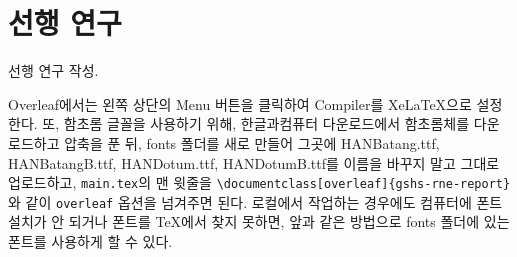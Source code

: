 \section{선행 연구}
선행 연구 작성.

Overleaf에서는 왼쪽 상단의 Menu 버튼을 클릭하여 Compiler를 XeLaTeX으로 설정한다. 또, 함초롬 글꼴을 사용하기 위해, 한글과컴퓨터 다운로드에서 함초롬체를 다운로드하고 압축을 푼 뒤, fonts 폴더를 새로 만들어 그곳에 HANBatang.ttf, HANBatangB.ttf, HANDotum.ttf, HANDotumB.ttf를 이름을 바꾸지 말고 그대로 업로드하고, \texttt{main.tex}의 맨 윗줄을 \texttt{\textbackslash documentclass[overleaf]\{gshs-rne-report\}}와 같이 \texttt{overleaf} 옵션을 넘겨주면 된다. 로컬에서 작업하는 경우에도 컴퓨터에 폰트 설치가 안 되거나 폰트를 TeX에서 찾지 못하면, 앞과 같은 방법으로 fonts 폴더에 있는 폰트를 사용하게 할 수 있다.